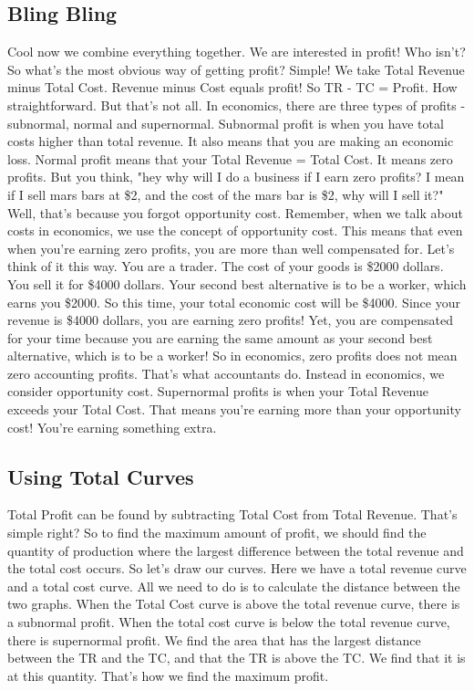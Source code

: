 \subsection{Bling Bling}
Cool now we combine everything together. We are interested in profit! Who isn't? So what's the most obvious way of getting profit? Simple! We take Total Revenue minus Total Cost. Revenue minus Cost equals profit! So TR - TC = Profit. How straightforward. But that's not all. In economics, there are three types of profits - subnormal, normal and supernormal. Subnormal profit is when you have total costs higher than total revenue. It also means that you are making an economic loss. Normal profit means that your Total Revenue = Total Cost. It means zero profits. But you think, "hey why will I do a business if I earn zero profits? I mean if I sell mars bars at \$2, and the cost of the mars bar is \$2, why will I sell it?" Well, that's because you forgot opportunity cost. Remember, when we talk about costs in economics, we use the concept of opportunity cost. This means that even when you're earning zero profits, you are more than well compensated for. Let's think of it this way. You are a trader. The cost of your goods is \$2000 dollars. You sell it for \$4000 dollars. Your second best alternative is to be a worker, which earns you \$2000. So this time, your total economic cost will be \$4000. Since your revenue is \$4000 dollars, you are earning zero profits! Yet, you are compensated for your time because you are earning the same amount as your second best alternative, which is to be a worker! So in economics, zero profits does not mean zero accounting profits. That's what accountants do. Instead in economics, we consider opportunity cost. Supernormal profits is when your Total Revenue exceeds your Total Cost. That means you're earning more than your opportunity cost! You're earning something extra.
\subsection{Using Total Curves}
Total Profit can be found by subtracting Total Cost from Total Revenue. That's simple right? So to find the maximum amount of profit, we should find the quantity of production where the largest difference between the total revenue and the total cost occurs. So let's draw our curves. Here we have a total revenue curve and a total cost curve. All we need to do is to calculate the distance between the two graphs. When the Total Cost curve is above the total revenue curve, there is a subnormal profit. When the total cost curve is below the total revenue curve, there is supernormal profit. We find the area that has the largest distance between the TR and the TC, and that the TR is above the TC. We find that it is at this quantity. That's how we find the maximum profit.
